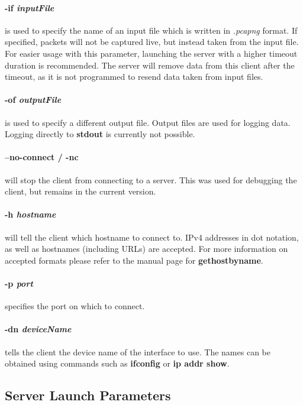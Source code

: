 \paragraph{-if \textit{inputFile}} is  used to specify the name of an input file which is written in \textit{.pcapng} format.
If specified, packets will not be captured live, but instead taken from the input file.
For easier usage with this parameter, launching the server with a higher timeout duration is recommended.
The server will remove data from this client after the timeout, as it is not programmed to resend data taken from input files.

\paragraph{-of \textit{outputFile}} is used to specify a different output file.
Output files are used for logging data.
Logging directly to \textbf{stdout} is currently not possible.

\paragraph{--no-connect / -nc} will stop the client from connecting to a server.
This was used for debugging the client, but remains in the current version.

\paragraph{-h \textit{hostname}} will tell the client which hostname to connect to.
IPv4 addresses in dot notation, as well as hostnames (including URLs) are accepted.
For more information on accepted formats please refer to the manual page for \textbf{gethostbyname}.

\paragraph{-p \textit{port}} specifies the port on which to connect.

\paragraph{-dn \textit{deviceName}} tells the client the device name of the interface to use.
The names can be obtained using commands such as \textbf{ifconfig} or \textbf{ip addr show}.

\subsection*{Server Launch Parameters}
